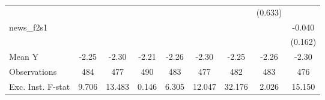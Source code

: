 {\begin{tabular}{l*{8}{c}}
            &                     &                     &                     &                     &                     &                     &     (0.633)         &                     \\
\addlinespace
news\_f2s1   &                     &                     &                     &                     &                     &                     &                     &      -0.040         \\
            &                     &                     &                     &                     &                     &                     &                     &     (0.162)         \\
\midrule
Mean Y      &       -2.25         &       -2.30         &       -2.21         &       -2.26         &       -2.30         &       -2.25         &       -2.26         &       -2.30         \\
Observations&         484         &         477         &         490         &         483         &         477         &         482         &         483         &         476         \\
Exc. Inst. F-stat&       9.706         &      13.483         &       0.146         &       6.305         &      12.047         &      32.176         &       2.026         &      15.150         \\
\bottomrule
\end{tabular}
}
